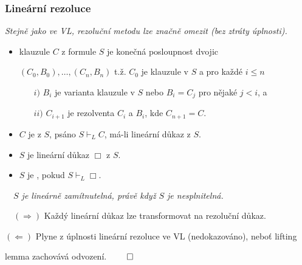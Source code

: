 \subsubsection*{Lineární rezoluce}
    {\it Stejně jako ve VL, rezoluční metodu lze značně omezit (bez ztráty úplnosti).}
    
    \begin{itemize}
    \item {} klauzule $C$ z formule $S$ je konečná posloupnost dvojic
    \smallskip
    
     $(C_0,B_0),\dots,(C_n,B_n)$ t.ž. $C_0$ je  klauzule v $S$ a pro každé $i\le n$
    \smallskip
    
    \begin{enumerate}
    \item[{\normalsize $i)$}] {\normalsize $B_i$ je varianta klauzule v $S$ nebo $B_i=C_j$ pro nějaké $j<i$, a}
    \medskip
    
    \item[{\normalsize $ii)$}] {\normalsize $C_{i+1}$ je rezolventa $C_i$ a $B_i$, kde $C_{n+1}=C$.}
    \smallskip
    
    \end{enumerate}
    
    \item $C$ je  z $S$, psáno $S \vdash_L C$, má-li lineární důkaz z $S$.
    \smallskip
    
    \item {} $S$ je lineární důkaz $\Box$ z $S$.
    \smallskip
    
    \item $S$ je , pokud $S \vdash_L \Box$.
    \end{itemize}
    \medskip
    
    {\bf {}}\ \ {\it $S$ je lineárně zamítnutelná, právě když $S$ je nesplnitelná.}
    \medskip
    
    {\it {}}\ \ $(\Rightarrow)$ Každý lineární důkaz lze transformovat na rezoluční důkaz.
    \smallskip
    
    $(\Leftarrow)$ Plyne z úplnosti lineární rezoluce ve VL (nedokazováno), neboť lifting
    \smallskip
    
    lemma zachovává  odvození. $\qed$
    
    
